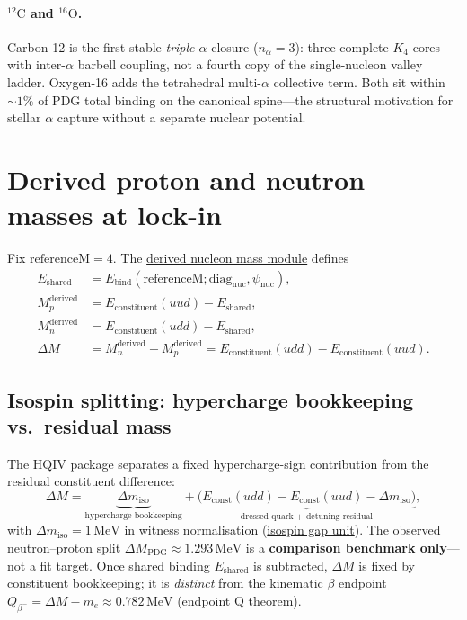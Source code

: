 \documentclass[11pt,notitlepage]{amsart}
\begin{document}
\paragraph{$^{12}\mathrm{C}$ and $^{16}\mathrm{O}$.}
Carbon-12 is the first stable \emph{triple-$\alpha$} closure ($n_\alpha=3$): three
complete $K_4$ cores with inter-$\alpha$ barbell coupling, not a fourth copy of the
single-nucleon valley ladder. Oxygen-16 adds the tetrahedral multi-$\alpha$ collective
term. Both sit within $\sim 1\%$ of PDG total binding on the canonical spine---the
structural motivation for stellar $\alpha$ capture without a separate nuclear potential.

\section{Derived proton and neutron masses at lock-in}
\label{sec:masses}

Fix $\mathrm{referenceM}=4$. The \hyperref[lean:derived-nucleon-mass]{derived nucleon
mass module} defines
\begin{align*}
  E_{\mathrm{shared}} &= E_{\mathrm{bind}}(\mathrm{referenceM};\mathrm{diag}_{\mathrm{nuc}},\psi_{\mathrm{nuc}}),\\
  M_p^{\mathrm{derived}} &= E_{\mathrm{constituent}}(uud) - E_{\mathrm{shared}},\\
  M_n^{\mathrm{derived}} &= E_{\mathrm{constituent}}(udd) - E_{\mathrm{shared}},\\
  \Delta M &= M_n^{\mathrm{derived}} - M_p^{\mathrm{derived}}
    = E_{\mathrm{constituent}}(udd)-E_{\mathrm{constituent}}(uud).
\end{align*}

\subsection{Isospin splitting: hypercharge bookkeeping vs.\ residual mass}

The HQIV package separates a fixed hypercharge-sign contribution from the residual
constituent difference:
\begin{equation}\label{eq:isospin-split}
  \Delta M
    = \underbrace{\Delta m_{\mathrm{iso}}}_{\text{hypercharge bookkeeping}}
    + \underbrace{\bigl(E_{\mathrm{const}}(udd)-E_{\mathrm{const}}(uud)-\Delta m_{\mathrm{iso}}\bigr)}_{\text{dressed-quark + detuning residual}},
\end{equation}
with $\Delta m_{\mathrm{iso}}=1\,\mathrm{MeV}$ in witness normalisation
(\hyperref[lean:isospin-gap-one]{isospin gap unit}). The observed neutron--proton
split $\Delta M_{\mathrm{PDG}}\approx 1.293\,\mathrm{MeV}$ is a \textbf{comparison
benchmark only}---not a fit target. Once shared binding $E_{\mathrm{shared}}$ is
subtracted, $\Delta M$ is fixed by constituent bookkeeping; it is \emph{distinct} from
the kinematic $\beta$ endpoint
$Q_{\beta^-}=\Delta M-m_e\approx 0.782\,\mathrm{MeV}$
(\hyperref[lean:endpoint-q-theorem]{endpoint Q theorem}).
\end{document}
